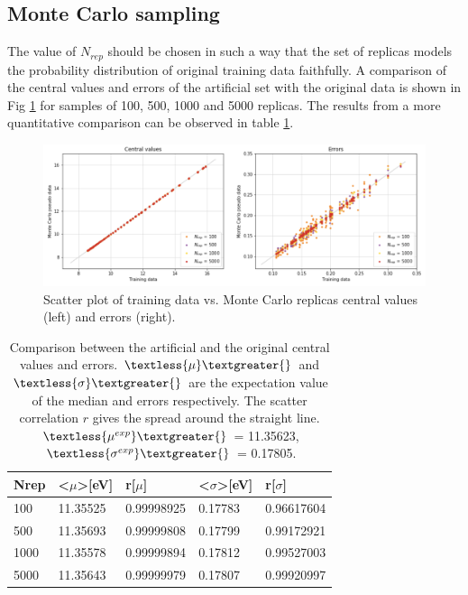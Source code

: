 \subsection{Monte Carlo sampling}
The value of $N_{rep}$ should be chosen in such a way that the set of replicas models the probability distribution of original training data faithfully. A comparison of the central values and errors of the artificial set with the original data is shown in Fig \ref{mc} for samples of 100, 500, 1000 and 5000 replicas. The results from a more quantitative comparison can be observed in table \ref{tablemc}.

\begin{figure}[H]
    \centering 
    \includegraphics[width=160mm]{plots/MC.png}
    \caption{Scatter plot of training data vs. Monte Carlo replicas central values (left) and errors (right). }
    \label{mc}
\end{figure}

\begin{table}[H]
\centering
\begin{tabular}{|l|ll|ll|}
\hline
Nrep & \textless{}$\mu$\textgreater {[}eV{]} & r{[}$\mu${]} & \textless{}$\sigma$\textgreater {[}eV{]} & r{[}$\sigma${]} \\ \hline
100  & 11.35525                              & 0.99998925   & 0.17783                                  & 0.96617604      \\ \hline
500  & 11.35693                              & 0.99999808   & 0.17799                                  & 0.99172921      \\ \hline
1000 & 11.35578                              & 0.99999894   & 0.17812                                  & 0.99527003      \\ \hline
5000 & 11.35643                              & 0.99999979   & 0.17807                                  & 0.99920997      \\ \hline
\end{tabular}
\caption{Comparison between the artificial and the original central values and errors. $\textless{\mu}\textgreater{}$ and $\textless{\sigma}\textgreater{}$ are the expectation value of the median and errors respectively. The scatter correlation $r$ gives the spread around the straight line. $\textless{\mu^{exp}}\textgreater{}$ = 11.35623, $\textless{\sigma^{exp}}\textgreater{}$ = 0.17805. }
\label{tablemc}
\end{table}


